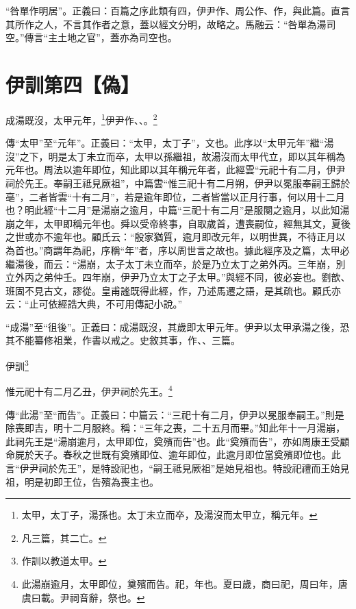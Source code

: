 {\noindent\shu{}\fzkt “咎單作明居”。正義曰：百篇之序此類有四，伊尹作、周公作、作，與此篇。直言其所作之人，不言其作者之意，蓋以經文分明，故略之。馬融云：“咎單為湯司空。”傳言“主土地之官”，蓋亦為司空也。 \par}

\section{伊訓第四【偽】}


成湯既沒，太甲元年，\footnote{太甲，太丁子，湯孫也。太丁未立而卒，及湯沒而太甲立，稱元年。}伊尹作、、。\footnote{凡三篇，其二亡。}


{\noindent\zhuan{}\fzbyks 傳“太甲”至“元年”。正義曰：“太甲，太丁子”，文也。此序以“太甲元年”繼“湯沒”之下，明是太丁未立而卒，太甲以孫繼祖，故湯沒而太甲代立，即以其年稱為元年也。周法以逾年即位，知此即以其年稱元年者，此經雲“元祀十有二月，伊尹祠於先王。奉嗣王祗見厥祖”，中篇雲“惟三祀十有二月朔，伊尹以冕服奉嗣王歸於亳”，二者皆雲“十有二月”，若是逾年即位，二者皆當以正月行事，何以用十二月也？明此經“十二月”是湯崩之逾月，中篇“三祀十有二月”是服闋之逾月，以此知湯崩之年，太甲即稱元年也。舜以受帝終事，自取歲首，遭喪嗣位，經無其文，夏後之世或亦不逾年也。顧氏云：“殷家猶質，逾月即改元年，以明世異，不待正月以為首也。”商謂年為祀，序稱“年”者，序以周世言之故也。據此經序及之篇，太甲必繼湯後，而云：“湯崩，太子太丁未立而卒，於是乃立太丁之弟外丙。三年崩，別立外丙之弟仲壬。四年崩，伊尹乃立太丁之子太甲。”與經不同，彼必妄也。劉歆、班固不見古文，謬從。皇甫謐既得此經，作，乃述馬遷之語，是其疏也。顧氏亦云：“止可依經誥大典，不可用傳記小說。” \par}

{\noindent\shu{}\fzkt “成湯”至“徂後”。正義曰：成湯既沒，其歲即太甲元年。伊尹以太甲承湯之後，恐其不能纂修祖業，作書以戒之。史敘其事，作、、三篇。 \par}

伊訓\footnote{作訓以教道太甲。}

惟元祀十有二月乙丑，伊尹祠於先王。\footnote{此湯崩逾月，太甲即位，奠殯而告。祀，年也。夏曰歲，商曰祀，周曰年，唐虞曰載。尹祠音辭，祭也。}


{\noindent\zhuan{}\fzbyks 傳“此湯”至“而告”。正義曰：中篇云：“三祀十有二月，伊尹以冕服奉嗣王。”則是除喪即吉，明十二月服終。稱：“三年之喪，二十五月而畢。”知此年十一月湯崩，此祠先王是“湯崩逾月，太甲即位，奠殯而告”也。此“奠殯而告”，亦如周康王受顧命屍於天子。春秋之世既有奠殯即位、逾年即位，此逾月即位當奠殯即位也。此言“伊尹祠於先王”，是特設祀也，“嗣王祗見厥祖”是始見祖也。特設祀禮而王始見祖，明是初即王位，告殯為喪主也。 \par}

